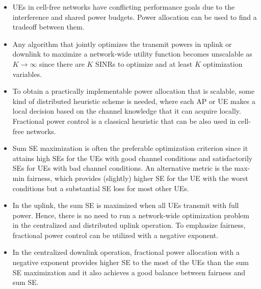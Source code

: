 \begin{mdframed}[style=GrayFrame]

\begin{itemize}
\item UEs in cell-free networks have conflicting performance goals due to the interference and shared power budgets. Power allocation can be used to find a tradeoff between them. 

\item Any algorithm that jointly optimizes the transmit powers in uplink or downlink to maximize a network-wide utility function becomes unscalable as $K\to \infty$ since there are $K$ SINRs to optimize and at least $K$ optimization variables. 

\item To obtain a practically implementable power allocation that is scalable, some kind of distributed heuristic scheme is needed, where each AP or UE makes a local decision based on the channel knowledge that it can acquire locally. Fractional power control is a classical heuristic that can be also used in cell-free networks.

\item Sum SE maximization is often the preferable optimization criterion since it attains high SEs for the UEs with good channel conditions and satisfactorily SEs for UEs with bad channel conditions. An alternative metric is the max-min fairness, which provides (slightly) higher SE for the UE with the worst conditions but a substantial SE loss for most other UEs.

\item In the uplink, the sum SE  is maximized when all UEs transmit with full power. Hence, there is no need to run a network-wide optimization problem in the centralized and distributed uplink operation. To emphasize fairness, fractional power control can be utilized with a negative exponent.

\item In the centralized downlink operation, fractional power allocation with a negative exponent provides higher SE to the most of the UEs than the sum SE maximization and it also achieves a good balance between fairness and sum SE. 

\end{itemize}

\end{mdframed}



